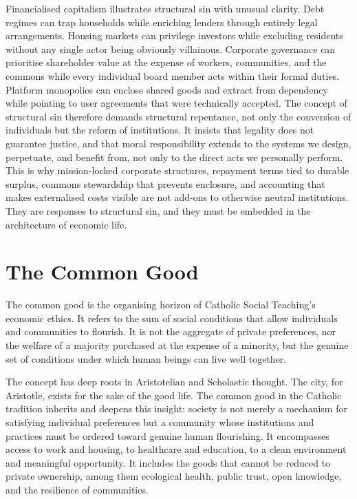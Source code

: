 \documentclass[11pt,a4paper,oneside]{book}
\begin{document}
Financialised capitalism illustrates structural sin with unusual clarity. Debt regimes can trap households while enriching lenders through entirely legal arrangements. Housing markets can privilege investors while excluding residents without any single actor being obviously villainous. Corporate governance can prioritise shareholder value at the expense of workers, communities, and the commons while every individual board member acts within their formal duties. Platform monopolies can enclose shared goods and extract from dependency while pointing to user agreements that were technically accepted. The concept of structural sin therefore demands structural repentance, not only the conversion of individuals but the reform of institutions. It insists that legality does not guarantee justice, and that moral responsibility extends to the systems we design, perpetuate, and benefit from, not only to the direct acts we personally perform. This is why mission-locked corporate structures, repayment terms tied to durable surplus, commons stewardship that prevents enclosure, and accounting that makes externalised costs visible are not add-ons to otherwise neutral institutions. They are responses to structural sin, and they must be embedded in the architecture of economic life.

\section*{The Common Good}

The common good is the organising horizon of Catholic Social Teaching's economic ethics. It refers to the sum of social conditions that allow individuals and communities to flourish. It is not the aggregate of private preferences, nor the welfare of a majority purchased at the expense of a minority, but the genuine set of conditions under which human beings can live well together.

The concept has deep roots in Aristotelian and Scholastic thought. The city, for Aristotle, exists for the sake of the good life. The common good in the Catholic tradition inherits and deepens this insight: society is not merely a mechanism for satisfying individual preferences but a community whose institutions and practices must be ordered toward genuine human flourishing. It encompasses access to work and housing, to healthcare and education, to a clean environment and meaningful opportunity. It includes the goods that cannot be reduced to private ownership, among them ecological health, public trust, open knowledge, and the resilience of communities.
\end{document}

